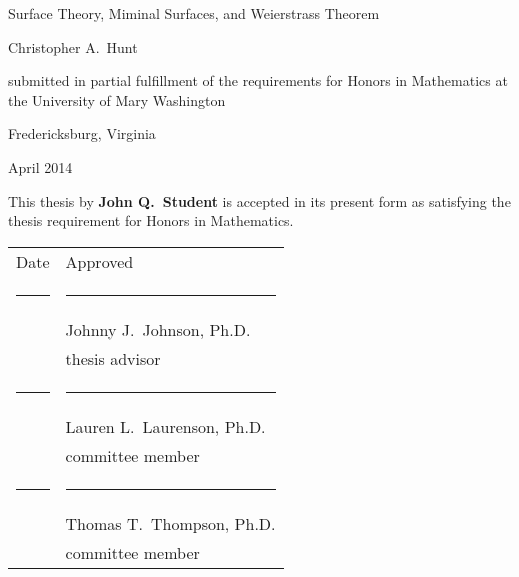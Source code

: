 \documentclass[11pt]{article}
\theoremstyle{definition}
\theoremstyle{remark}
\begin{document}


\protect{\thispagestyle{empty}}

\begin{center}

\LARGE

\phantom{1}

\vspace{1.5in}

\sc Surface Theory, Miminal Surfaces, and Weierstrass Theorem \normalfont

\Large

\vspace{1.0in}

Christopher A.\ Hunt

\vfill

submitted in partial fulfillment of the requirements for Honors in Mathematics at the
University of Mary Washington

\vspace{0.5in}

Fredericksburg, Virginia

\vspace{0.5in}

April 2014

\normalsize

\vspace{1.0in}

\end{center}

\pagebreak



\protect{\thispagestyle{empty}}

\phantom{1}

\vspace{0.5in}

\noindent  This thesis by \textbf{John Q.\ Student} is accepted in its present form as satisfying the thesis requirement
for Honors in Mathematics.

\vspace{1.0in}


\begin{tabular}{p{1.0in}l}
\sc Date & \sc Approved \\[.65in]
\rule{0.85in}{0.5pt} & \rule{2.6in}{0.5pt}\\
& Johnny J.\ Johnson, Ph.D.\\    %
& thesis advisor\\[.65in]
\rule{0.85in}{0.5pt} & \rule{2.6in}{0.5pt}\\
& Lauren L.\ Laurenson, Ph.D.\\  %
& committee member\\[.65in]
\rule{0.85in}{0.5pt} & \rule{2.6in}{0.5pt}\\
& Thomas T.\ Thompson, Ph.D.\\   %
& committee member
\end{tabular}
\end{document}

